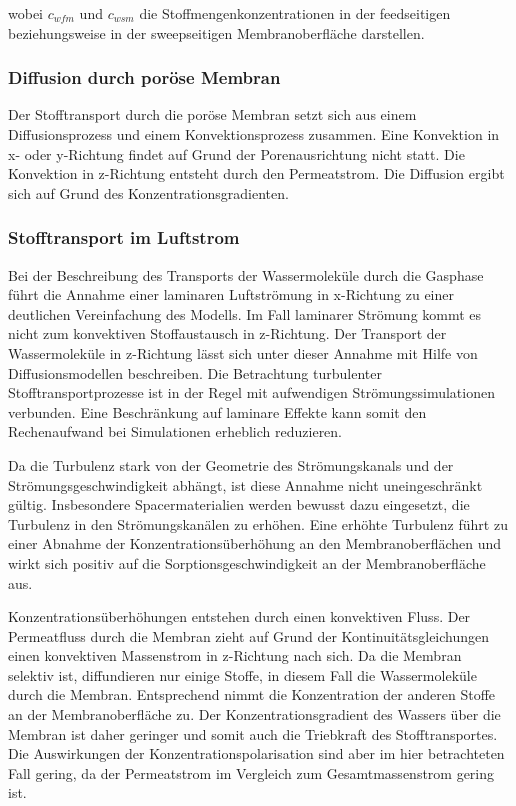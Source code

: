 \begin{normalsize}
wobei $c_{wfm}$ und $c_{wsm}$ die Stoffmengenkonzentrationen in der feedseitigen beziehungsweise in der sweepseitigen Membranoberfläche darstellen.


\subsubsection{Diffusion durch poröse Membran}

Der Stofftransport durch die poröse Membran setzt sich aus einem Diffusionsprozess und einem Konvektionsprozess zusammen. Eine Konvektion in x- oder y-Richtung findet auf Grund der Porenausrichtung nicht statt. Die Konvektion in z-Richtung entsteht durch den Permeatstrom. Die Diffusion ergibt sich auf Grund des Konzentrationsgradienten. 

\subsubsection{Stofftransport im Luftstrom}

Bei der Beschreibung des Transports der Wassermoleküle durch die Gasphase führt die Annahme einer laminaren Luftströmung in x-Richtung zu einer deutlichen Vereinfachung des Modells. Im Fall laminarer Strömung kommt es nicht zum konvektiven Stoffaustausch in z-Richtung. Der Transport der Wassermoleküle in z-Richtung lässt sich unter dieser Annahme mit Hilfe von Diffusionsmodellen beschreiben.
Die Betrachtung turbulenter Stofftransportprozesse ist in der Regel mit aufwendigen Strömungssimulationen verbunden. Eine Beschränkung auf laminare Effekte kann somit den Rechenaufwand bei Simulationen erheblich reduzieren. 

Da die Turbulenz stark von der Geometrie  des Strömungskanals und der Strömungsgeschwindigkeit abhängt, ist diese Annahme nicht uneingeschränkt gültig. Insbesondere Spacermaterialien werden bewusst dazu eingesetzt, die Turbulenz in den Strömungskanälen zu erhöhen.
Eine erhöhte Turbulenz führt zu einer Abnahme der Konzentrationsüberhöhung an den Membranoberflächen und wirkt sich positiv auf die Sorptionsgeschwindigkeit an der Membranoberfläche aus.  

  
Konzentrationsüberhöhungen entstehen durch einen konvektiven Fluss. Der Permeatfluss durch die Membran zieht auf Grund der Kontinuitätsgleichungen einen konvektiven Massenstrom in z-Richtung nach sich. Da die Membran selektiv ist, diffundieren nur einige Stoffe, in diesem Fall die Wassermoleküle durch die Membran. Entsprechend nimmt die Konzentration der anderen Stoffe an der Membranoberfläche zu. Der Konzentrationsgradient des Wassers über die Membran ist daher geringer und somit auch die Triebkraft des Stofftransportes. Die Auswirkungen der Konzentrationspolarisation sind aber im hier betrachteten Fall gering, da der Permeatstrom im Vergleich zum Gesamtmassenstrom gering ist. 



\end{normalsize}
